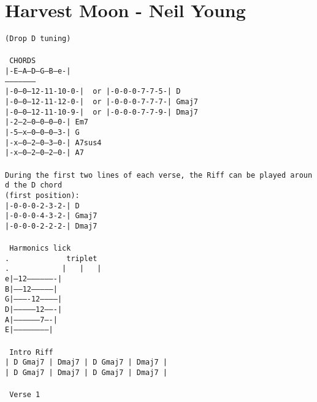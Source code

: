 \newpage
\section{Harvest Moon - Neil Young}
\label{Harvest Moon - Neil Young}
\texttt{(Drop\ D\ tuning)\\
\\
\lbrack\ CHORDS\rbrack\\
|-E--A--D--G--B--e-|\\
--------------------\\
|-0--0--12-11-10-0-|\ \ or\ |-0-0-0-7-7-5-|\ D\ \ \ \\
|-0--0--12-11-12-0-|\ \ or\ |-0-0-0-7-7-7-|\ Gmaj7\\
|-0--0--12-11-10-9-|\ \ or\ |-0-0-0-7-7-9-|\ Dmaj7\\
|-2--2--0--0--0--0-|\ Em7\ \ \\
|-5--x--0--0--0--3-|\ G\ \ \ \\
|-x--0--2--0--3--0-|\ A7sus4\\
|-x--0--2--0--2--0-|\ A7\ \ \\
\\
During\ the\ first\ two\ lines\ of\ each\ verse,\ the\ Riff\ can\ be\ played\ around\ the\ D\ chord\ \\
(first\ position):\\
|-0-0-0-2-3-2-|\ D\ \ \ \\
|-0-0-0-4-3-2-|\ Gmaj7\ \\
|-0-0-0-2-2-2-|\ Dmaj7\ \\
\\
\lbrack\ Harmonics lick\rbrack\\
.\ \ \ \ \ \ \ \ \ \ \ \ \ triplet\\
.\ \ \ \ \ \ \ \ \ \ \ \ | \ \ |\ \ \ |\\
e|--12-------------------|\\
B|------12---------------|\\
G|----------12-----------|\\
D|--------------12-------|\\
A|------------------7----|\\
E|-----------------------|\\
\\
\lbrack\ Intro\ Riff\rbrack\ \ \\
|\ D\ Gmaj7\ |\ Dmaj7\ |\ D\ Gmaj7\ |\ Dmaj7\ |\\
|\ D\ Gmaj7\ |\ Dmaj7\ |\ D\ Gmaj7\ |\ Dmaj7\ |\\
\\
\lbrack\ Verse\ 1\rbrack\\
}
